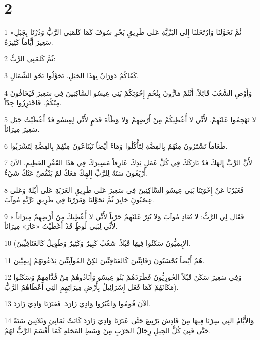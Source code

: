 \chapter{2}

\par 1 «ثُمَّ تَحَوَّلنَا وَارْتَحَلنَا إِلى البَرِّيَّةِ عَلى طَرِيقِ بَحْرِ سُوفَ كَمَا كَلمَنِي الرَّبُّ وَدُرْنَا بِجَبَلِ سَعِيرَ أَيَّاماً كَثِيرَةً.
\par 2 ثُمَّ كَلمَنِي الرَّبُّ:
\par 3 كَفَاكُمْ دَوَرَانٌ بِهَذَا الجَبَلِ. تَحَوَّلُوا نَحْوَ الشِّمَالِ.
\par 4 وَأَوْصِ الشَّعْبَ قَائِلاً: أَنْتُمْ مَارُّونَ بِتُخُمِ إِخْوَتِكُمْ بَنِي عِيسُو السَّاكِنِينَ فِي سَعِيرَ فَيَخَافُونَ مِنْكُمْ. فَاحْتَرِزُوا جِدّاً.
\par 5 لا تَهْجِمُوا عَليْهِمْ. لأَنِّي لا أُعْطِيكُمْ مِنْ أَرْضِهِمْ وَلا وَطْأَةَ قَدَمٍ لأَنِّي لِعِيسُو قَدْ أَعْطَيْتُ جَبَل سَعِيرَ مِيرَاثاً.
\par 6 طَعَاماً تَشْتَرُونَ مِنْهُمْ بِالفِضَّةِ لِتَأْكُلُوا وَمَاءً أَيْضاً تَبْتَاعُونَ مِنْهُمْ بِالفِضَّةِ لِتَشْرَبُوا.
\par 7 لأَنَّ الرَّبَّ إِلهَكَ قَدْ بَارَكَكَ فِي كُلِّ عَمَلِ يَدِكَ عَارِفاً مَسِيرَكَ فِي هَذَا القَفْرِ العَظِيمِ. الآنَ أَرْبَعُونَ سَنَةً لِلرَّبِّ إِلهِكَ مَعَكَ لمْ يَنْقُصْ عَنْكَ شَيْءٌ.
\par 8 فَعَبَرْنَا عَنْ إِخْوَتِنَا بَنِي عِيسُو السَّاكِنِينَ فِي سَعِيرَ عَلى طَرِيقِ العَرَبَةِ عَلى أَيْلةَ وَعَلى عِصْيُونَِ جَابِرَ ثُمَّ تَحَوَّلنَا وَمَرَرْنَا فِي طَرِيقِ بَرِّيَّةِ مُوآبَ.
\par 9 «فَقَال لِي الرَّبُّ: لا تُعَادِ مُوآبَ وَلا تُثِرْ عَليْهِمْ حَرْباً لأَنِّي لا أُعْطِيكَ مِنْ أَرْضِهِمْ مِيرَاثاً. لأَنِّي لِبَنِي لُوطٍَ قَدْ أَعْطَيْتُ «عَارَ» مِيرَاثاً.
\par 10 (الإِيمِيُّونَ سَكَنُوا فِيهَا قَبْلاً. شَعْبٌ كَبِيرٌ وَكَثِيرٌ وَطَوِيلٌ كَالعَنَاقِيِّينَ.
\par 11 هُمْ أَيْضاً يُحْسَبُونَ رَفَائِيِّينَ كَالعَنَاقِيِّينَ لكِنَّ المُوآبِيِّينَ يَدْعُونَهُمْ إِيمِيِّينَ.
\par 12 وَفِي سَعِيرَ سَكَنَ قَبْلاً الحُورِيُّونَ فَطَرَدَهُمْ بَنُو عِيسُو وَأَبَادُوهُمْ مِنْ قُدَّامِهِمْ وَسَكَنُوا مَكَانَهُمْ كَمَا فَعَل إِسْرَائِيلُ بِأَرْضِ مِيرَاثِهِمِ التِي أَعْطَاهُمُ الرَّبُّ).
\par 13 اَلآنَ قُومُوا وَاعْبُرُوا وَادِيَ زَارَدَ. فَعَبَرْنَا وَادِيَ زَارَدَ.
\par 14 وَالأَيَّامُ التِي سِرْنَا فِيهَا مِنْ قَادِشَ بَرْنِيعَ حَتَّى عَبَرْنَا وَادِيَ زَارَدَ كَانَتْ ثَمَانِيَ وَثَلاثِينَ سَنَةً حَتَّى فَنِيَ كُلُّ الجِيلِ رِجَالُ الحَرْبِ مِنْ وَسَطِ المَحَلةِ كَمَا أَقْسَمَ الرَّبُّ لهُمْ.
